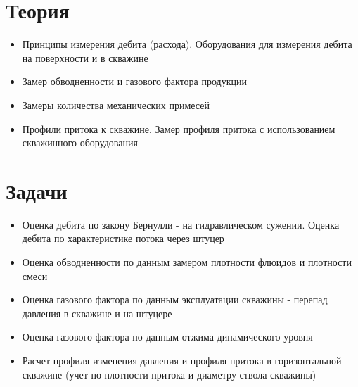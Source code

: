 \section{Теория}
\begin{itemize}
    \item Принципы измерения дебита (расхода). Оборудования для измерения дебита на поверхности и в скважине
    \item Замер обводненности и газового фактора продукции
    \item Замеры количества механических примесей
    \item Профили притока к скважине. Замер профиля притока с использованием скважинного оборудования
\end{itemize}

\section{Задачи}

\begin{itemize}
    \item Оценка дебита по закону Бернулли - на гидравлическом сужении. Оценка дебита по характеристике потока через штуцер
    \item Оценка обводненности по данным замером плотности флюидов и плотности смеси
    \item Оценка газового фактора по данным эксплуатации скважины - перепад давления в скважине и на штуцере
    \item Оценка газового фактора по данным отжима динамического уровня
    \item Расчет профиля изменения давления и профиля притока в горизонтальной скважине (учет по плотности притока и диаметру ствола скважины)
    
\end{itemize}
    